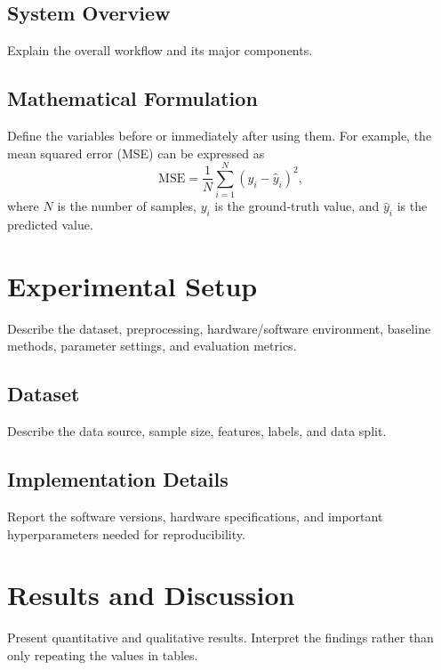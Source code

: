 \documentclass[conference]{IEEEtran}
\begin{document}
\subsection{System Overview}
Explain the overall workflow and its major components.


\subsection{Mathematical Formulation}
Define the variables before or immediately after using them. For example,
the mean squared error (MSE) can be expressed as
\begin{equation}
    \mathrm{MSE} = \frac{1}{N}\sum_{i=1}^{N}(y_i-\hat{y}_i)^2,
    \label{eq:mse}
\end{equation}
where $N$ is the number of samples, $y_i$ is the ground-truth value, and
$\hat{y}_i$ is the predicted value.

\section{Experimental Setup}
Describe the dataset, preprocessing, hardware/software environment,
baseline methods, parameter settings, and evaluation metrics.

\subsection{Dataset}
Describe the data source, sample size, features, labels, and data split.

\subsection{Implementation Details}
Report the software versions, hardware specifications, and important
hyperparameters needed for reproducibility.

\section{Results and Discussion}
Present quantitative and qualitative results. Interpret the findings rather
than only repeating the values in tables.
\end{document}
